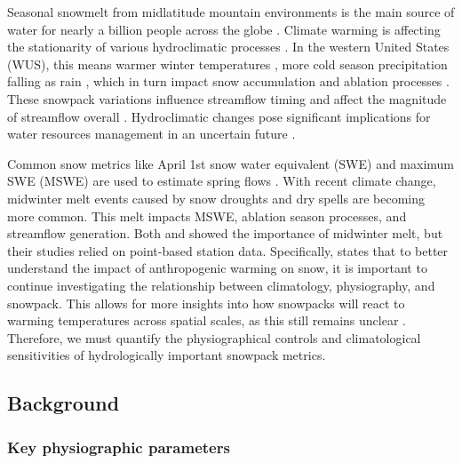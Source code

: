 Seasonal snowmelt from midlatitude mountain environments is the main source of water for nearly a billion people across the globe \citep{sturmWaterLifeSnow2017}.
Climate warming is affecting the stationarity of various hydroclimatic processes \citep{millyStationarityDeadWhither2008}. In the western United States (WUS), this means warmer winter temperatures \citep{gergelEffectsClimateChange2017}, more cold season precipitation falling as rain \citep{knowlesTrendsSnowfallRainfall2006}, which in turn impact snow accumulation and ablation processes \citep{kapnickCausesRecentChanges2012}. These snowpack variations influence streamflow timing \citep{stewartChangesSnowmeltRunoff2004} and affect the magnitude of streamflow overall \citep{barnhartSnowmeltRateDictates2016}. Hydroclimatic changes pose significant implications for water resources management in an uncertain future \citep{livnehDroughtLessPredictable2020}.

Common snow metrics like April 1st snow water equivalent (SWE) and maximum SWE (MSWE) are used to estimate spring flows \citep{paganoEvaluationOfficialWestern2004}. With recent climate change, midwinter melt events caused by snow droughts \citep{harpoldDefiningSnowDrought2017} and dry spells \citep{hatchettMidwinterDrySpells2023} are becoming more common. This melt impacts MSWE, ablation season processes, and streamflow generation. Both \cite{harpoldHumidityDeterminesSnowpack2018} and \cite{musselmanWinterMeltTrends2021} showed the importance of midwinter melt, but their studies relied on point-based station data. Specifically, \cite{musselmanWinterMeltTrends2021} states that to better understand the impact of anthropogenic warming on snow, it is important to continue investigating the relationship between climatology, physiography, and snowpack. This allows for more insights into how snowpacks will react to warming temperatures across spatial scales, as this still remains unclear \citep{molotchEstimatingDistributionSnow2008}. Therefore, we must quantify the physiographical controls and climatological sensitivities of hydrologically important snowpack metrics.

\hypertarget{ch2-intro-2}{\subsection{Background}\label{ch2-intro-2}}
\hypertarget{ch2-intro-3}{\subsubsection{Key physiographic parameters}\label{ch2-intro-3}}


